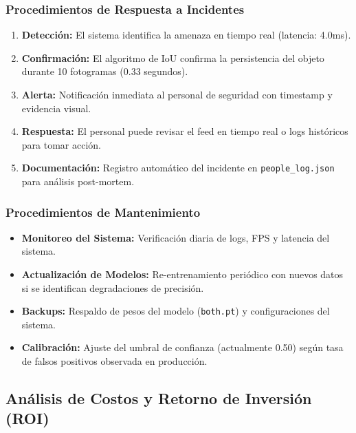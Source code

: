 \documentclass[12pt, a4paper]{article}
\begin{document}
\begin{itemize}
\subsubsection{Procedimientos de Respuesta a Incidentes}
\begin{enumerate}
\item \textbf{Detección:} El sistema identifica la amenaza en tiempo real (latencia: 4.0ms).
\item \textbf{Confirmación:} El algoritmo de IoU confirma la persistencia del objeto durante 10 fotogramas (0.33 segundos).
\item \textbf{Alerta:} Notificación inmediata al personal de seguridad con timestamp y evidencia visual.
\item \textbf{Respuesta:} El personal puede revisar el feed en tiempo real o logs históricos para tomar acción.
\item \textbf{Documentación:} Registro automático del incidente en \texttt{people\_log.json} para análisis post-mortem.
\end{enumerate}

\subsubsection{Procedimientos de Mantenimiento}
\begin{itemize}
\item \textbf{Monitoreo del Sistema:} Verificación diaria de logs, FPS y latencia del sistema.
\item \textbf{Actualización de Modelos:} Re-entrenamiento periódico con nuevos datos si se identifican degradaciones de precisión.
\item \textbf{Backups:} Respaldo de pesos del modelo (\texttt{both.pt}) y configuraciones del sistema.
\item \textbf{Calibración:} Ajuste del umbral de confianza (actualmente 0.50) según tasa de falsos positivos observada en producción.
\end{itemize}

\subsection{Análisis de Costos y Retorno de Inversión (ROI)}


\end{itemize}
\end{document}
